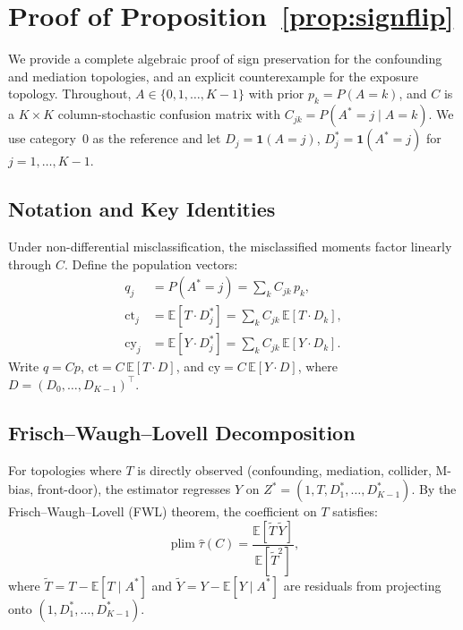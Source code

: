 \section{Proof of Proposition~\ref{prop:signflip}}
\label{app:proof}

We provide a complete algebraic proof of sign preservation for the confounding and mediation topologies, and an explicit counterexample for the exposure topology.
Throughout, $A\in\{0,1,\dots,K{-}1\}$ with prior $p_k=P(A{=}k)$, and $C$ is a $K{\times}K$ column-stochastic confusion matrix with $C_{jk}=P(A^*{=}j\mid A{=}k)$.
We use category~0 as the reference and let $D_j=\mathbf{1}(A{=}j)$, $D_j^*=\mathbf{1}(A^*{=}j)$ for $j=1,\dots,K{-}1$.

\subsection{Notation and Key Identities}
\label{app:notation}

Under non-differential misclassification, the misclassified moments factor linearly through $C$.
Define the population vectors:
\begin{align}
  q_j &= P(A^*{=}j) = \textstyle\sum_k C_{jk}\,p_k, \label{eq:q}\\
  \mathrm{ct}_j &= \mathbb{E}[T\cdot D_j^*] = \textstyle\sum_k C_{jk}\,\mathbb{E}[T\cdot D_k], \label{eq:ct}\\
  \mathrm{cy}_j &= \mathbb{E}[Y\cdot D_j^*] = \textstyle\sum_k C_{jk}\,\mathbb{E}[Y\cdot D_k]. \label{eq:cy}
\end{align}
Write $q = Cp$, $\mathrm{ct} = C\,\mathbb{E}[T\cdot D]$, and $\mathrm{cy} = C\,\mathbb{E}[Y\cdot D]$, where $D=(D_0,\dots,D_{K-1})^\top$.

\subsection{Frisch--Waugh--Lovell Decomposition}
\label{app:fwl}

For topologies where $T$ is directly observed (confounding, mediation, collider, M-bias, front-door), the estimator regresses $Y$ on $Z^*=(1,T,D_1^*,\dots,D_{K-1}^*)$.
By the Frisch--Waugh--Lovell (FWL) theorem, the coefficient on $T$ satisfies:
\begin{equation}
  \operatorname{plim}\hat{\tau}(C)
  = \frac{\mathbb{E}[\tilde{T}\,\tilde{Y}]}{\mathbb{E}[\tilde{T}^2]},
  \label{eq:fwl}
\end{equation}
where $\tilde{T}=T-\mathbb{E}[T\mid A^*]$ and $\tilde{Y}=Y-\mathbb{E}[Y\mid A^*]$ are residuals from projecting onto $(1,D_1^*,\dots,D_{K-1}^*)$.

